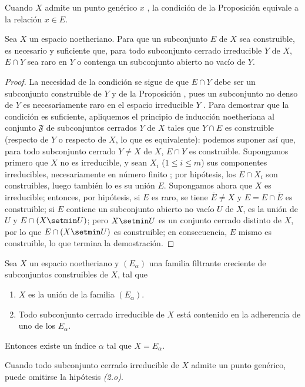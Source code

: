 \documentclass[oneside]{amsart}
\renewcommand{\leq}{\leqslant}
\let\EGAOriginalLabel\label
\renewcommand{\label}[1]{\phantomsection\EGAOriginalLabel{#1}}
\begin{document}
Cuando $X$ admite un punto genérico $x$ , la condición de la Proposición  equivale a la relación $x\in E$.

\begin{proposition}[9.2.3]
\label{0.9.2.3}
Sea $X$ un espacio noetheriano.
Para que un subconjunto $E$ de $X$ sea construible, es necesario y suficiente que, para todo subconjunto cerrado irreducible $Y$ de $X$, $E\cap Y$ sea raro en $Y$ o contenga un subconjunto abierto no vacío de $Y$.
\end{proposition}

\begin{proof}
La necesidad de la condición se sigue de que $E\cap Y$ debe ser un subconjunto construible de $Y$ y de la Proposición , pues un subconjunto no denso de $Y$ es necesariamente raro en el espacio irreducible $Y$ .
Para demostrar que la condición es suficiente, apliquemos el principio de inducción noetheriana  al conjunto $\mathfrak{F}$ de subconjuntos cerrados $Y$ de $X$ tales que $Y\cap E$ es construible (respecto de $Y$ o respecto de $X$, lo que es equivalente): podemos suponer así que, para todo subconjunto cerrado $Y\neq X$ de $X$, $E\cap Y$ es construible.
Supongamos primero que $X$ no es irreducible, y sean $X_i$ ($1\leq i\leq m$) sus componentes irreducibles, necesariamente en número finito ; por hipótesis, los $E\cap X_i$ son construibles, luego también lo es su unión $E$.
Supongamos ahora que $X$ es irreducible; entonces, por hipótesis, si $E$ es raro, se tiene $\overline{E}\neq X$ y $E=E\cap\overline{E}$ es construible; si $E$ contiene un subconjunto abierto no vacío $U$ de $X$, es la unión de $U$ y $E\cap(X\setmin U)$; pero $X\setmin U$ es un conjunto cerrado distinto de $X$, por lo que $E\cap(X\setmin U)$ es construible; en consecuencia, $E$ mismo es construible, lo que termina la demostración.
\end{proof}

\begin{corollary}[9.2.4]
\label{0.9.2.4}
Sea $X$ un espacio noetheriano y $(E_\alpha)$ una familia filtrante creciente de subconjuntos construibles de $X$, tal que
\begin{enumerate}
  \item[\emph{(1.o)}] $X$ es la unión de la familia $(E_\alpha)$.
  \item[\emph{(2.o)}] Todo subconjunto cerrado irreducible de $X$ está contenido en la adherencia de uno de los $E_\alpha$.
\end{enumerate}

Entonces existe un índice $\alpha$ tal que $X=E_\alpha$.

Cuando todo subconjunto cerrado irreducible de $X$ admite un punto genérico, puede omitirse la hipótesis \emph{(2.o)}.
\end{corollary}
\end{document}
